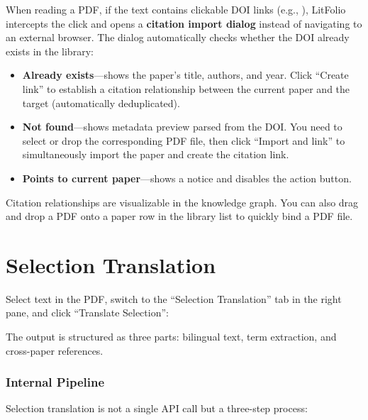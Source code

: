 When reading a PDF, if the text contains clickable DOI links (e.g.,
), LitFolio intercepts the click and opens a
\textbf{citation import dialog} instead of navigating to an external browser.
The dialog automatically checks whether the DOI already exists in the library:

\begin{itemize}
  \item \textbf{Already exists}---shows the paper's title, authors, and year. Click
    ``Create link'' to establish a  citation relationship between the
    current paper and the target (automatically deduplicated).
  \item \textbf{Not found}---shows metadata preview parsed from the DOI. You need to
    select or drop the corresponding PDF file, then click ``Import and link'' to
    simultaneously import the paper and create the citation link.
  \item \textbf{Points to current paper}---shows a notice and disables the action button.
\end{itemize}

\begin{tipbox}
Citation relationships are visualizable in the knowledge graph. You can also drag and
drop a PDF onto a paper row in the library list to quickly bind a PDF file.
\end{tipbox}

\section{Selection Translation}

Select text in the PDF, switch to the ``Selection Translation'' tab in the right pane,
and click ``Translate Selection'':


The output is structured as three parts: bilingual text, term extraction, and
cross-paper references.

\subsubsection{Internal Pipeline}

Selection translation is not a single API call but a three-step process:

